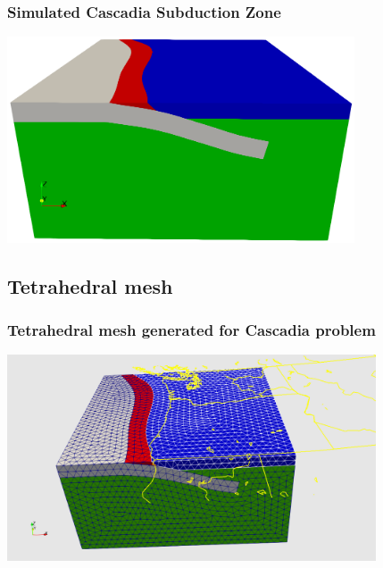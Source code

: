 \documentclass[aspectratio=169]{beamer}
\begin{document}
\begin{frame}
  \frametitle{Simulated Cascadia Subduction Zone}
 
  \vfill
  \begin{center}
    \includegraphics[height=6.1cm]{figs/subduction3d_conceptualmodel}
  \end{center}
  \vfill

\end{frame}


\subsection{Tetrahedral mesh}

\begin{frame}
  \frametitle{Tetrahedral mesh generated for Cascadia problem}
 
  \vfill
  \begin{center}
    \includegraphics[height=6.1cm]{figs/subduction3d_tetmesh}
  \end{center}
  \vfill
 
\end{frame}
\end{document}
